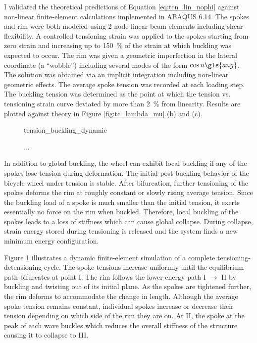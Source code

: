 \documentclass[\rootdir/thesis.tex]{subfiles}
\begin{document}
I validated the theoretical predictions of Equation \eqref{eq:tcn_lin_nophi} against non-linear finite-element calculations implemented in ABAQUS 6.14. The spokes and rim were both modeled using 2-node linear beam elements including shear flexibility. A controlled tensioning strain was applied to the spokes starting from zero strain and increasing up to \SI{150}{\percent} of the strain at which buckling was expected to occur. The rim was given a geometric imperfection in the lateral coordinate (a ``wobble'') including several modes of the form $\cos{n\gls{ang}}$. The solution was obtained via an implicit integration including non-linear geometric effects. The average spoke tension was recorded at each loading step. The buckling tension was determined as the point at which the tension vs. tensioning strain curve deviated by more than \SI{2}{\percent} from linearity. Results are plotted against theory in Figure \ref{fig:tc_lambda_mu} (b) and (c).

\begin{figure}
\centering
{tension_buckling_dynamic}
\caption{...}
\label{fig:tension_buckling_dynamic}
\end{figure}

In addition to global buckling, the wheel can exhibit local buckling if any of the spokes lose tension during deformation. The initial post-buckling behavior of the bicycle wheel under tension is stable. After bifurcation, further tensioning of the spokes deforms the rim at roughly constant or slowly rising average tension. Since the buckling load of a spoke is much smaller than the initial tension, it exerts essentially no force on the rim when buckled. Therefore, local buckling of the spokes leads to a loss of stiffness which can cause global collapse. During collapse, strain energy stored during tensioning is released and the system finds a new minimum energy configuration.

Figure \ref{fig:tension_buckling_dynamic} illustrates a dynamic finite-element simulation of a complete tensioning-detensioning cycle. The spoke tensions increase uniformly until the equilibrium path bifurcates at point I. The rim follows the lower-energy path I $\rightarrow$ II by buckling and twisting out of its initial plane. As the spokes are tightened further, the rim deforms to accommodate the change in length. Although the average spoke tension remains constant, individual spokes increase or decrease their tension depending on which side of the rim they are on. At II, the spoke at the peak of each wave buckles which reduces the overall stiffness of the structure causing it to collapse to III.
\end{document}
